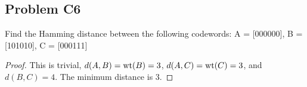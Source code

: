 \documentclass[../../../main.tex]{subfiles}
\begin{document}
\subsection{Problem C6}
\begin{wts}
    Find the Hamming distance between the following codewords: A = [000000], B = [101010], C = [000111]
\end{wts}
\begin{proof}
This is trivial, $d(A,B)=\operatorname{wt}(B)=3$, $d(A,C)=\operatorname{wt}(C)=3$, and $d(B,C) = 4$. The minimum distance is $3$. 
\end{proof}
\end{document}

